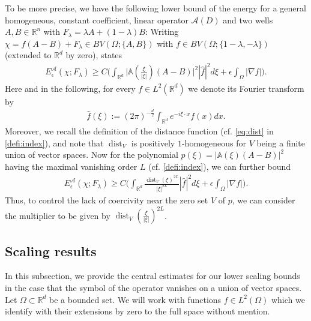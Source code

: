 \documentclass[a4paper, 10pt, twoside, notitlepage]{amsart}
\theoremstyle{plain}
\newcommand{\R}{\mathbb{R}}
\newcommand{\A}{\mathcal{A}}
\renewcommand{\AA}{\mathbb{A}}
\DeclareMathOperator{\dist}{dist}
\begin{document}
                  To be more precise, we have the following lower bound of the energy for a general homogeneous, constant coefficient, linear operator $\A(D)$ and two wells $A,B \in \R^n$ with $F_\lambda = \lambda A + (1-\lambda) B$:
                Writing $\chi = f(A-B) + F_\lambda \in BV(\Omega;\{A,B\})$ with $f \in BV(\Omega;\{1-\lambda,-\lambda\})$ (extended to $\R^d$ by zero), \cite[Corollary 3.2]{RRT23} states
                \begin{align} \label{eq:LowerBoundRRT}
                  E^{\A}_{\epsilon}(\chi;F_\lambda) \geq C \Big(\int_{\R^d} \Big|\AA(\frac{\xi}{|\xi|})(A-B)\Big|^2 |\hat{f}|^2 d\xi + \epsilon \int_\Omega |\nabla f| \Big).
                \end{align}
                Here and in the following, for every $f\in L^2(\R^d)$ we denote its Fourier transform by
                \begin{align*}
                \hat f(\xi) := (2\pi)^{-\frac{d}{2}}\int_{\R^d} e^{-i \xi \cdot x} f(x)dx.
                \end{align*}
                Moreover, we recall the definition of the distance function (cf. \cref{eq:dist} in \cref{defi:index}), and note that $\dist_V$ is positively $1$-homogeneous for $V$ being a finite union of vector spaces.
                Now for the polynomial $p(\xi) = |\AA(\xi)(A-B)|^2$ having the maximal vanishing order $L$ (cf. \cref{defi:index}), we can further bound
                \begin{align*}
                  E^{\A}_\epsilon(\chi;F_\lambda) \geq C \Big( \int_{\R^d} \frac{\dist_V(\xi)^{2L}}{|\xi|^{2L}} |\hat{f}|^2 d\xi + \epsilon \int_\Omega |\nabla f| \Big).
                \end{align*}
                Thus, to control the lack of coercivity near the zero set $V$ of $p$, we can consider the multiplier to be given by $\dist_V(\frac{\xi}{|\xi|})^{2L}$.
                

		
		
		\subsection{Scaling results}
		\label{sec:scaling}
		
                In this subsection, we provide the central estimates for our lower scaling bounds in the case that the symbol of the operator vanishes on a union of vector spaces. Let $\Omega\subset\R^d$ be a bounded set. We will work with functions $f\in L^2(\Omega)$ which we
		identify with their extensions by zero to the full space without mention.
		
\end{document}
